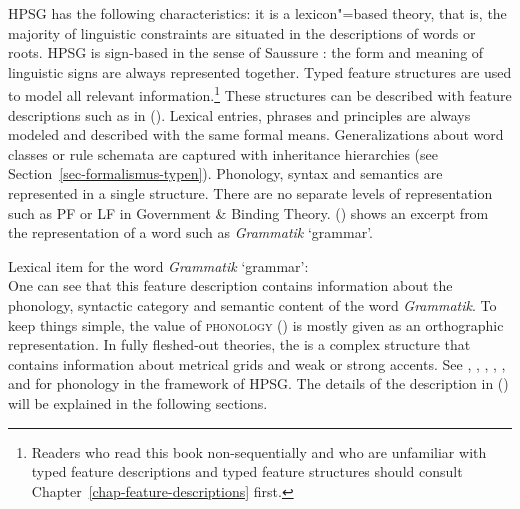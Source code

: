 HPSG has the following characteristics: it is a lexicon"=based theory, that is, the majority of
linguistic constraints are situated in the descriptions of words or roots. HPSG is sign-based in the
sense of Saussure \citeyearpar{Saussure16a-Fr}\nocite{Saussure16a}: the form and meaning of linguistic signs are always
represented together. Typed feature structures are used to model all relevant information.\footnote{
Readers who read this book non-sequentially and who are unfamiliar with typed feature descriptions
and typed feature structures should consult Chapter~\ref{chap-feature-descriptions} first.
} These
structures can be described with feature descriptions such as in (). Lexical entries, phrases
and principles are always modeled and described with the same formal means.  Generalizations about
word classes or rule schemata are captured with inheritance hierarchies (see Section~\ref{sec-formalismus-typen}). Phonology, syntax and
semantics are represented in a single structure. There are no separate levels of representation such
as PF or LF in Government \& Binding Theory.  () shows an excerpt from the representation of
a word such as \emph{Grammatik} `grammar'.

\ea
Lexical item for the word \emph{Grammatik} `grammar':\\
\z
One can see that this feature description contains information about the phonology, syntactic category and semantic content of the word
\emph{Grammatik}. To keep things simple, the value of \textsc{phonology} (\phon) is mostly given as
an orthographic representation. In fully fleshed-out
theories, the \phonv is a complex structure that contains information about metrical grids and weak or strong accents.
See , , , ,
, and  for phonology in the
framework of HPSG. The details of the description in () will be explained in the following sections.

